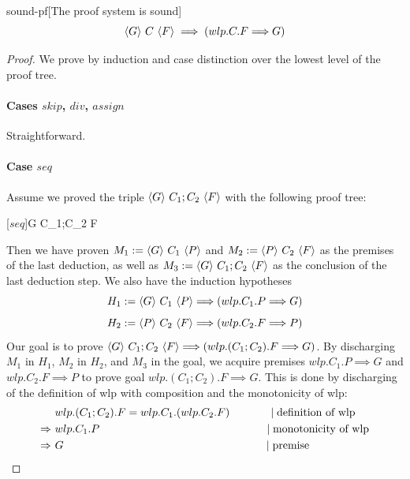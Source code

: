 \begin{lemma}{sound-pf}[The proof system is sound]
	\ \\
	$$\langle G \rangle\ C\ \langle F \rangle\implies (wlp.C.F{\implies} G)$$
\end{lemma}

\begin{proof}
	We prove by induction and case distinction over the lowest level of the proof tree. 
	\paragraph{Cases $skip$, $div$, $assign$} Straightforward.
	\paragraph{Case $seq$} 
	Assume we proved the triple $\langle G \rangle\ C_1;C_2\ \langle F \rangle$ with the following proof tree: 
	\begin{center}
		\begin{prooftree}
			\Ellipsis{}{ }
			[$seq$]{\nlp G {C_1;C_2} F}
		\end{prooftree}
	\end{center}
	Then we have proven $M_1:=\langle G \rangle\ C_1\ \langle P \rangle $ and $M_2:=\langle P \rangle\ C_2\ \langle F \rangle $ as the premises of the last deduction, as well as $M_3:=\langle G \rangle\ C_1;C_2\ \langle F \rangle$ as the conclusion of the last deduction step.
	We also have the induction hypotheses $$H_1:=\langle G \rangle\ C_1\ \langle P \rangle {\implies} (wlp.C_1.P{\implies} G)$$ 
	$$H_2:=\langle P \rangle\ C_2\ \langle F \rangle {\implies} (wlp.C_2.F{\implies} P)$$
	Our goal is to prove $\langle G \rangle\ C_1;C_2\ \langle F \rangle {\implies} (wlp.(C_1;C_2).F{\implies} G)$. 
	By discharging $M_1$ in $H_1$, $M_2$ in $H_2$, and $M_3$ in the goal, we acquire premises $wlp.C_1.P{\implies} G$ and $wlp.C_2.F{\implies} P$ to prove goal $wlp.(C_1;C_2).F{\implies} G$. 
	This is done by discharging of the definition of wlp with composition and the monotonicity of wlp: 
	\begin{align*}
		&\ wlp.(C_1;C_2).F = wlp.C_1.(wlp.C_2.F) 
		\hspace{0.1\linewidth}\mid \text{definition of wlp} \\
		\Rightarrow &\ wlp.C_1.P  
		\hspace{0.433\linewidth}\mid \text{monotonicity of wlp}\\
		\Rightarrow &\ G  
		\hspace{0.527\linewidth}\mid \text{premise}
	\end{align*}


\end{proof}
